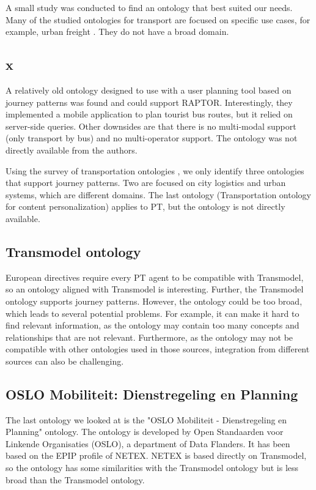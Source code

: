 A small study was conducted to find an ontology that best suited our needs. Many of the studied ontologies for transport are focused on specific use cases, for example, urban freight \cite{bouhana_ontology-based_2015}. They do not have a broad domain. 
\subsection{x}
A relatively old ontology designed to use with a user planning tool based on journey patterns \cite{5507372} was found and could support RAPTOR. Interestingly, they implemented a mobile application to plan tourist bus routes, but it relied on server-side queries. Other downsides are that there is no multi-modal support (only transport by bus) and no multi-operator support. The ontology was not directly available from the authors.

Using the survey of transportation ontologies \cite{katsumi_ontologies_2018}, we only identify three ontologies that support journey patterns. Two are focused on city logistics and urban systems, which are different domains. The last ontology (Transportation ontology for content personalization) applies to PT, but the ontology is not directly available.

\subsection{Transmodel ontology}
European directives require every PT agent to be compatible with Transmodel, so an ontology aligned with Transmodel is interesting. Further, the Transmodel ontology supports journey patterns. However, the ontology could be too broad, which leads to several potential problems. For example, it can make it hard to find relevant information, as the ontology may contain too many concepts and relationships that are not relevant. Furthermore, as the ontology may not be compatible with other ontologies used in those sources, integration from different sources can also be challenging.

\subsection{OSLO Mobiliteit: Dienstregeling en Planning}
The last ontology we looked at is the "OSLO Mobiliteit - Dienstregeling en Planning" \cite{noauthor_oslo_2023} ontology. The ontology is developed by Open Standaarden voor Linkende Organisaties (OSLO), a department of Data Flanders. It has been based on the EPIP profile of NETEX. NETEX is based directly on  Transmodel, so the ontology has some similarities with the Transmodel ontology but is less broad than the Transmodel ontology.

